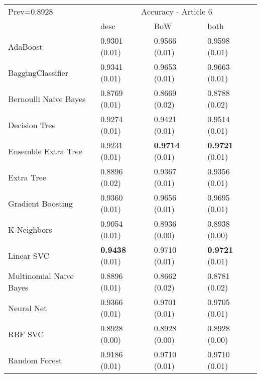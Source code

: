 \begin{tabular}{|l|l|l|l| }
\hline
Prev=0.8928 &  \multicolumn{3}{c|}{Accuracy - Article 6} \\
\cline{2-4} & desc & BoW & both \\ \hline
AdaBoost                & 0.9301 (0.01) & 0.9566 (0.01) & 0.9598 (0.01)\\
BaggingClassifier       & 0.9341 (0.01) & 0.9653 (0.01) & 0.9663 (0.01)\\
Bernoulli Naive Bayes   & 0.8769 (0.01) & 0.8669 (0.02) & 0.8788 (0.02)\\
Decision Tree           & 0.9274 (0.01) & 0.9421 (0.01) & 0.9514 (0.01)\\
Ensemble Extra Tree     & 0.9231 (0.01) & {\bf 0.9714} (0.01) & {\bf 0.9721} (0.01)\\
Extra Tree              & 0.8896 (0.02) & 0.9367 (0.01) & 0.9356 (0.01)\\
Gradient Boosting       & 0.9360 (0.01) & 0.9656 (0.01) & 0.9695 (0.01)\\
K-Neighbors             & 0.9054 (0.01) & 0.8936 (0.00) & 0.8938 (0.00)\\
Linear SVC              & {\bf 0.9438} (0.01) & 0.9710 (0.01) & {\bf 0.9721} (0.01)\\
Multinomial Naive Bayes & 0.8896 (0.01) & 0.8662 (0.02) & 0.8781 (0.02)\\
Neural Net              & 0.9366 (0.01) & 0.9701 (0.01) & 0.9705 (0.01)\\
RBF SVC                 & 0.8928 (0.00) & 0.8928 (0.00) & 0.8928 (0.00)\\
Random Forest           & 0.9186 (0.01) & 0.9710 (0.01) & 0.9710 (0.01)\\
\hline
\end{tabular}